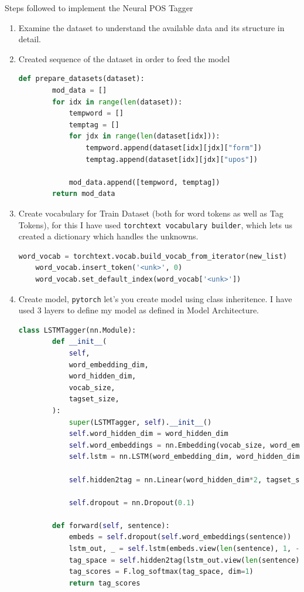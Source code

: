 Steps followed to implement the Neural POS Tagger

\begin{enumerate}
	\item Examine the dataset to understand the available data and its structure in detail.
	\item Created sequence of the dataset in order to feed the model
	\begin{lstlisting}[language=Python]
	def prepare_datasets(dataset):
    	mod_data = []
   		for idx in range(len(dataset)):
       		tempword = []
       		temptag = []
       		for jdx in range(len(dataset[idx])):
           		tempword.append(dataset[idx][jdx]["form"])
           		temptag.append(dataset[idx][jdx]["upos"])

        	mod_data.append([tempword, temptag])
    	return mod_data
	\end{lstlisting}
	
	\item Create vocabulary for Train Dataset (both for word tokens as well as Tag Tokens), for this I have used \texttt{torchtext vocabulary builder}, which lets us created a dictionary which handles the unknowns.
	\begin{lstlisting}[language=Python]
	word_vocab = torchtext.vocab.build_vocab_from_iterator(new_list)
	word_vocab.insert_token('<unk>', 0)            
	word_vocab.set_default_index(word_vocab['<unk>'])
	\end{lstlisting}

	\item Create model, \texttt{pytorch} let's you create model using class inheritence. I have used 3 layers to define my model as defined in Model Architecture.
	
	\begin{lstlisting}[language=Python]
	class LSTMTagger(nn.Module):
    	def __init__(
        	self,
        	word_embedding_dim,
        	word_hidden_dim,
        	vocab_size,
        	tagset_size,
    	):
        	super(LSTMTagger, self).__init__()
        	self.word_hidden_dim = word_hidden_dim
        	self.word_embeddings = nn.Embedding(vocab_size, word_embedding_dim)
        	self.lstm = nn.LSTM(word_embedding_dim, word_hidden_dim, num_layers = 1, bidirectional = True)

        	self.hidden2tag = nn.Linear(word_hidden_dim*2, tagset_size)

        	self.dropout = nn.Dropout(0.1)

    	def forward(self, sentence):
        	embeds = self.dropout(self.word_embeddings(sentence))
        	lstm_out, _ = self.lstm(embeds.view(len(sentence), 1, -1))
        	tag_space = self.hidden2tag(lstm_out.view(len(sentence), -1))
        	tag_scores = F.log_softmax(tag_space, dim=1)
        	return tag_scores


\end{lstlisting}
\end{enumerate}
